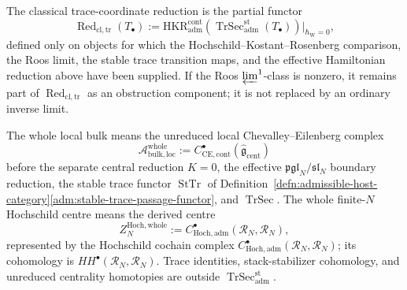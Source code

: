 \begin{defn}
  The classical trace-coordinate reduction is the partial functor
	  \[
	    \operatorname{Red}_{\mathrm{cl,tr}}(T_\bullet)
	    :=
	    \mathrm{HKR}^{\mathrm{cont}}_{\mathrm{adm}}\!\left(
	      \operatorname{TrSec}^{\mathrm{st}}_{\mathrm{adm}}(T_\bullet)
	    \right)\big|_{\hbar_{\mathrm{W}}=0},
	  \]
  defined only on objects for which the Hochschild--Kostant--Rosenberg
  comparison, the Roos limit, the stable trace transition maps, and the
  effective Hamiltonian reduction above have been supplied.  If the Roos
  \(\varprojlim^1\)-class is nonzero, it remains part of
  \(\operatorname{Red}_{\mathrm{cl,tr}}\) as an obstruction component;
  it is not replaced by an ordinary inverse limit.

  The whole local bulk means the unreduced local Chevalley--Eilenberg
  complex
  \[
    \mathcal A_{\mathrm{bulk,loc}}^{\mathrm{whole}}
    :=
    C^\bullet_{\mathrm{CE},\mathrm{cont}}
    (\widehat{\mathfrak g}_{\mathrm{cent}})
  \]
  before the separate central reduction \(K=0\), the effective
  \(\mathfrak{pgl}_N/\mathfrak{sl}_N\) boundary reduction, the stable
  trace functor \(\operatorname{StTr}\) of
  Definition~\ref{defn:admissible-host-category}\ref{adm:stable-trace-passage-functor},
  and \(\operatorname{TrSec}\).  The whole finite-\(N\) Hochschild
  centre means the derived centre
  \[
    Z^{\mathrm{Hoch,whole}}_N
    :=
    C^\bullet_{\mathrm{Hoch},\mathrm{adm}}
    (\mathcal R_N,\mathcal R_N),
  \]
  represented by
  the Hochschild cochain complex
  \(C^\bullet_{\mathrm{Hoch},\mathrm{adm}}(\mathcal R_N,\mathcal R_N)\);
  its cohomology is \(HH^\bullet(\mathcal R_N,\mathcal R_N)\).  Trace
  identities, stack-stabilizer cohomology, and unreduced centrality
  homotopies are outside
  \(\operatorname{TrSec}^{\mathrm{st}}_{\mathrm{adm}}\).
\end{defn}

